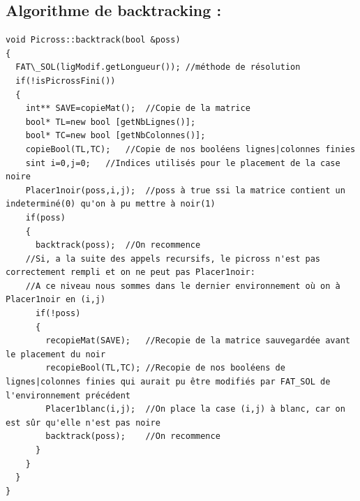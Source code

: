 \documentclass{article}
\begin{document}
\subsection{Algorithme de backtracking :}
\begin{verbatim}
void Picross::backtrack(bool &poss)
{
  FAT\_SOL(ligModif.getLongueur()); //méthode de résolution
  if(!isPicrossFini())
  {
    int** SAVE=copieMat();	//Copie de la matrice
    bool* TL=new bool [getNbLignes()];
    bool* TC=new bool [getNbColonnes()];
    copieBool(TL,TC);	//Copie de nos booléens lignes|colonnes finies
    sint i=0,j=0;	//Indices utilisés pour le placement de la case noire
    Placer1noir(poss,i,j);	//poss à true ssi la matrice contient un indeterminé(0) qu'on à pu mettre à noir(1)
    if(poss)
    {
      backtrack(poss);	//On recommence
	//Si, a la suite des appels recursifs, le picross n'est pas correctement rempli et on ne peut pas Placer1noir:
	//A ce niveau nous sommes dans le dernier environnement où on à Placer1noir en (i,j)
      if(!poss)
      {
        recopieMat(SAVE);	//Recopie de la matrice sauvegardée avant le placement du noir
        recopieBool(TL,TC);	//Recopie de nos booléens de lignes|colonnes finies qui aurait pu être modifiés par FAT_SOL de l'environnement précédent
        Placer1blanc(i,j);	//On place la case (i,j) à blanc, car on est sûr qu'elle n'est pas noire
        backtrack(poss);	//On recommence
      }
    }
  }
}
\end{verbatim}
\end{document}
